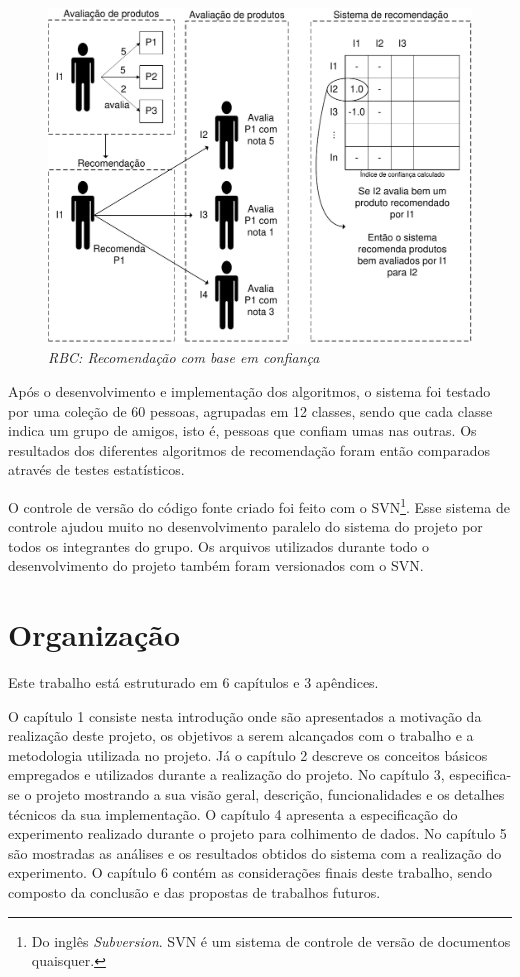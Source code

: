 \begin{figure}
  \centering
  \includegraphics[width=\textwidth]{imagens/RBC}
  \caption{\it RBC: Recomendação com base em confiança}
  \label{fig:RBC}
\end{figure}

 Após o desenvolvimento e implementação dos algoritmos, o sistema foi testado por uma coleção de 60 pessoas, agrupadas em 12 classes, sendo que cada classe indica um grupo de amigos, isto é, pessoas que confiam umas nas outras. Os resultados dos diferentes algoritmos de recomendação foram então comparados através de testes estatísticos.

 O controle de versão do código fonte criado foi feito com o SVN\footnote{Do inglês \textit{Subversion}. SVN é um sistema de controle de versão de documentos quaisquer.}. Esse sistema de controle ajudou muito no desenvolvimento paralelo do sistema do projeto por todos os integrantes do grupo. Os arquivos utilizados durante todo o desenvolvimento do projeto também foram versionados com o SVN.


\section{Organização} %

 Este trabalho está estruturado em 6 capítulos e 3 apêndices.
 
 O capítulo 1 consiste nesta introdução onde são apresentados a motivação da realização deste projeto, os objetivos a serem alcançados com o trabalho e a metodologia utilizada no projeto.
 Já o capítulo 2 descreve os conceitos básicos empregados e utilizados durante a realização do projeto.
 No capítulo 3,	especifica-se o projeto mostrando a sua visão geral, descrição, funcionalidades e os detalhes técnicos da sua implementação.
 O capítulo 4 apresenta a especificação do experimento realizado durante o projeto para colhimento de dados.
 No capítulo 5 são mostradas as análises e os resultados obtidos do sistema com a realização do experimento.
 O capítulo 6 contém as considerações finais deste trabalho, sendo composto da conclusão e das propostas de trabalhos futuros.
 
